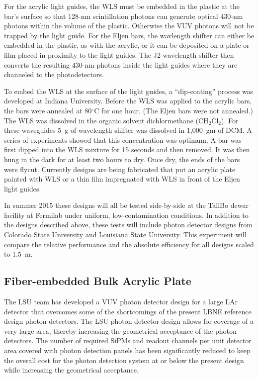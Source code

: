 For the acrylic light guides, the WLS must be embedded in the plastic
at the bar's surface so that 128-nm scintillation photons can generate
optical 430-nm photons within the volume of the plastic.  Otherwise
the VUV photons will not be trapped by the light guide.  For the Eljen
bars, the wavlength shifter can either be embedded in the plastic, as
with the acrylic, or it can be deposited on a plate or film placed in
proximity to the light guides.  The J2 wavelength shifter then
converts the resulting 430-nm photons inside the light guides where
they are channeled to the photodetectors.

To embed the WLS at the surface of the light guides, a ``dip-coating''
process was developed at Indiana University.  Before the WLS was
applied to the acrylic bars, the bars were annealed at 80$^\circ$C for one
hour.  (The Eljen bars were not annealed.)  The WLS was dissolved in the
organic solvent dichlormethane (CH$_2$Cl$_2$).  For these waveguides
5~g of wavelength shifter was dissolved in 1,000~gm of DCM.  A
series of experiments showed that this concentration was optimum.  A
bar was first dipped into the WLS mixture for 15 seconds and then
removed.  It was then hung in the dark for at least two hours to dry.
Once dry, the ends of the bars were flycut.  Currently designs are
being fabricated that put an acrylic plate painted with WLS or a thin
film impregnated with WLS in front of the Eljen light guides.

In summer 2015 these designs will all be tested side-by-side at the
TallBo dewar facility at Fermilab under uniform, low-contamination
conditions.  In addition to the designs described above, these tests
will include photon detector designs from Colorado State University
and Louisiana State University.  This experiment will compare the
relative performance and the absolute efficiency for all designs
scaled to 1.5~m.

\subsection{Fiber-embedded Bulk Acrylic Plate}

The LSU team has developed a VUV photon detector
design for a large LAr detector that overcomes some of the
shortcomings of the present LBNE reference design photon detectors. The LSU
photon detector design allows for coverage of a very large area, thereby
increasing the geometrical acceptance of the photon detectors. The
number of required SiPMs and readout channels per unit detector area
covered with photon detection panels has been significantly reduced to
keep the overall cost for the photon detection system at or below the
present design while increasing the geometrical acceptance. %

